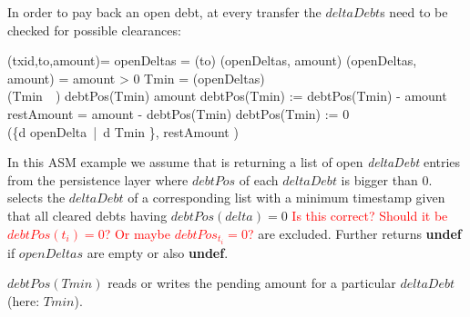 In order to pay back an open debt, at every transfer the $deltaDebt$s need to be checked for possible clearances:

\begin{asm}
	(txid,to,amount)=\+
		\LET openDeltas = (to)\+
			(openDeltas, amount)\dec\-
	\WHERE \+
		(openDeltas, amount) =\+
		\IF amount > 0 \THEN\+
			\LET Tmin = (openDeltas)\\
			\IF (Tmin\ \neq\ \UNDEF) \THEN\+
				\IF debtPos(Tmin) \ge amount \THEN\+
					debtPos(Tmin) := debtPos(Tmin) - amount\-
				\ELSE\+
					\LET restAmount = amount - debtPos(Tmin)\+
						debtPos(Tmin) := 0\\
						(\{d \in openDelta\ |\ d \neq Tmin \}, restAmount )\dec\dec\dec\-
\end{asm}


In this ASM example we assume that  is returning a list of open \textit{deltaDebt} entries from the persistence layer where $debtPos$ of each $deltaDebt$ is bigger than $0$.  selects the $deltaDebt$ of a corresponding list with a minimum timestamp given that all cleared debts having $debtPos(delta) = 0$ \textcolor{red}{Is this correct? Should it be $debtPos(t_i) = 0$? Or maybe $debtPos_{t_i} = 0$? }are excluded. Further  returns \textbf{undef} if $openDeltas$ are empty or also \textbf{undef}.

$debtPos(Tmin)$ reads or writes the pending amount for a particular $deltaDebt$ (here: $Tmin$).









